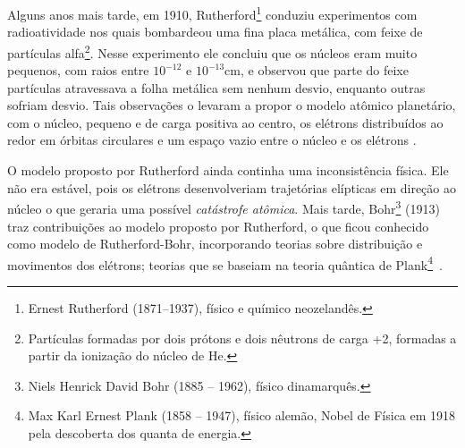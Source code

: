 Alguns anos mais tarde, em 1910, Rutherford\footnote{Ernest Rutherford (1871--1937), físico e químico neozelandês.} conduziu experimentos com radioatividade nos quais bombardeou uma fina placa metálica, com feixe de partículas alfa\footnote{Partículas formadas por dois prótons e dois nêutrons de carga +2, formadas a partir da ionização do núcleo de He.}. Nesse experimento ele concluiu que os núcleos eram muito pequenos, com raios entre $10^{-12}$ e $10^{-13}$cm, e observou que parte do feixe partículas atravessava a folha metálica sem nenhum desvio, enquanto outras sofriam desvio. Tais observações o levaram a propor o modelo atômico planetário, com o núcleo, pequeno e de carga positiva ao centro, os elétrons distribuídos ao redor em órbitas circulares e um espaço vazio entre o núcleo e os elétrons \cite{book:Oliveira2006}.

O modelo proposto por Rutherford ainda continha uma inconsistência física. Ele não era estável, pois os elétrons desenvolveriam trajetórias elípticas em direção ao núcleo o que geraria uma possível \textit{catástrofe atômica}. Mais tarde, Bohr\footnote{Niels Henrick David Bohr (1885 -- 1962), físico dinamarquês.} (1913) traz contribuições ao modelo proposto por Rutherford, o que ficou conhecido como modelo de Rutherford-Bohr, incorporando teorias sobre distribuição e movimentos dos elétrons; teorias que se baseiam na teoria quântica de Plank\footnote{Max Karl Ernest Plank (1858 -- 1947), físico alemão, Nobel de Física em 1918 pela descoberta dos quanta de energia.}~\cite{book:pinheiro2011}.



